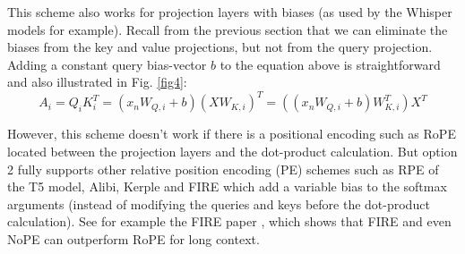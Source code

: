 \documentclass{article}
\numberwithin{equation}{section} %
\begin{document}
This scheme also works for projection layers with biases (as used by the Whisper models for example). Recall from the previous section that we can eliminate the biases from the key and value projections, but not from the query projection. Adding a constant query bias-vector $b$ to the equation above is straightforward and also illustrated in Fig. \ref{fig4}:
\begin{equation*}
  A_i = Q_i K_i^T = (x_n W_{Q,i} + b) (X W_{K,i})^T = ((x_n W_{Q,i} + b) W_{K,i}^T) X^T
\end{equation*}

However, this scheme doesn’t work if there is a positional encoding such as RoPE located between the projection layers and the dot-product calculation. But option 2 fully supports other relative position encoding (PE) schemes such as RPE of the T5 model, Alibi, Kerple and FIRE \citep{FIRE} which add a variable bias to the softmax arguments (instead of modifying the queries and keys before the dot-product calculation). See for example the FIRE paper \citep{FIRE}, which shows that FIRE and even NoPE can outperform RoPE for long context.
\end{document}
